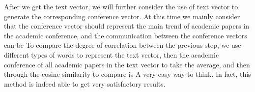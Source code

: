 \begin{bigabstract}
After we get the text vector, we will further consider the use of text vector to generate the corresponding conference vector. At this time we mainly consider that the conference vector should represent the main trend of academic papers in the academic conference, and the communication between the conference vectors can be To compare the degree of correlation between the previous step, we use different types of words to represent the text vector, then the academic conference of all academic papers in the text vector to take the average, and then through the cosine similarity to compare is A very easy way to think. In fact, this method is indeed able to get very satisfactory results.

\end{bigabstract}
